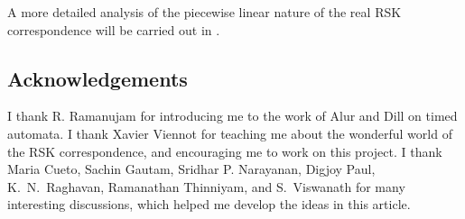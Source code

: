 \documentclass[10pt]{amsproc}
\theoremstyle{definition}
\theoremstyle{remark}
\begin{document}
A more detailed analysis of the piecewise linear nature of the real RSK correspondence will be carried out in \cite{cgp}.
\subsection*{Acknowledgements}
I thank R. Ramanujam for introducing me to the work of Alur and Dill on timed automata.
I thank Xavier Viennot for teaching me about the wonderful world of the RSK correspondence, and encouraging me to work on this project.
I thank Maria Cueto, Sachin Gautam, Sridhar P. Narayanan, Digjoy Paul, K.~N.~Raghavan, Ramanathan Thinniyam, and S.~Viswanath for many interesting discussions, which helped me develop the ideas in this article.


\end{document}
